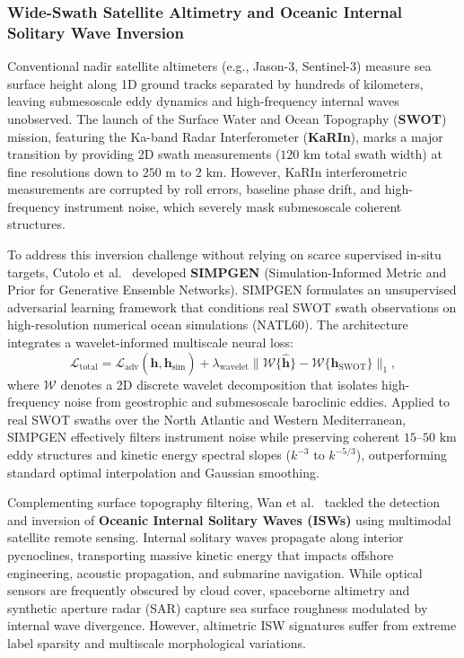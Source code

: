 \subsubsection{Wide-Swath Satellite Altimetry and Oceanic Internal Solitary Wave Inversion}
Conventional nadir satellite altimeters (e.g., Jason-3, Sentinel-3) measure sea surface height along 1D ground tracks separated by hundreds of kilometers, leaving submesoscale eddy dynamics and high-frequency internal waves unobserved. The launch of the Surface Water and Ocean Topography (\textbf{SWOT}) mission, featuring the Ka-band Radar Interferometer (\textbf{KaRIn}), marks a major transition by providing 2D swath measurements ($120\text{ km}$ total swath width) at fine resolutions down to $250\text{ m}$ to $2\text{ km}$. However, KaRIn interferometric measurements are corrupted by roll errors, baseline phase drift, and high-frequency instrument noise, which severely mask submesoscale coherent structures.

To address this inversion challenge without relying on scarce supervised in-situ targets, Cutolo et al.~\cite{cutolo2025swot} developed \textbf{SIMPGEN} (Simulation-Informed Metric and Prior for Generative Ensemble Networks). SIMPGEN formulates an unsupervised adversarial learning framework that conditions real SWOT swath observations on high-resolution numerical ocean simulations (NATL60). The architecture integrates a wavelet-informed multiscale neural loss:
\begin{equation}
    \mathcal{L}_{\text{total}} = \mathcal{L}_{\text{adv}}(\hat{\mathbf{h}}, \mathbf{h}_{\text{sim}}) + \lambda_{\text{wavelet}} \|\mathcal{W}\{\hat{\mathbf{h}}\} - \mathcal{W}\{\mathbf{h}_{\text{SWOT}}\}\|_1,
    \label{eq:simpgen_loss}
\end{equation}
where $\mathcal{W}$ denotes a 2D discrete wavelet decomposition that isolates high-frequency noise from geostrophic and submesoscale baroclinic eddies. Applied to real SWOT swaths over the North Atlantic and Western Mediterranean, SIMPGEN effectively filters instrument noise while preserving coherent $15\text{--}50\text{ km}$ eddy structures and kinetic energy spectral slopes ($k^{-3}$ to $k^{-5/3}$), outperforming standard optimal interpolation and Gaussian smoothing.

Complementing surface topography filtering, Wan et al.~\cite{wan2024ste} tackled the detection and inversion of \textbf{Oceanic Internal Solitary Waves (ISWs)} using multimodal satellite remote sensing. Internal solitary waves propagate along interior pycnoclines, transporting massive kinetic energy that impacts offshore engineering, acoustic propagation, and submarine navigation. While optical sensors are frequently obscured by cloud cover, spaceborne altimetry and synthetic aperture radar (SAR) capture sea surface roughness modulated by internal wave divergence. However, altimetric ISW signatures suffer from extreme label sparsity and multiscale morphological variations.

